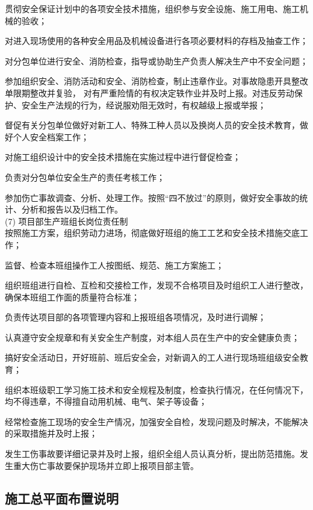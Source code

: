  贯彻安全保证计划中的各项安全技术措施，组织参与安全设施、施工用电、施工机械的验收；

 对进入现场使用的各种安全用品及机械设备进行各项必要材料的存档及抽查工作；

 对分包单位进行安全、消防检查，指导或协助生产负责人解决生产中不安全问题；

 参加组织安全、消防活动和安全、消防检查，制止违章作业。对事故隐患开具整改单限期整改并复验，
对有严重险情的有权决定轶作业并及时上报。对违反劳动保护、安全生产法规的行为，经说服劝阻无效时，有权越级上报或举报；

 督促有关分包单位做好对新工人、特殊工种人员以及换岗人员的安全技术教育，做好个人安全档案工作；

 对施工组织设计中的安全技术措施在实施过程中进行督促检查；

 负责对分包单位安全生产的责任考核工作；

 参加伤亡事故调查、分析、处理工作。按照“四不放过”的原则，做好安全事故的统计、分析和报告以及归档工作。\\

(7) 项目部生产班组长岗位责任制\\

 按照施工方案，组织劳动力进场，彻底做好班组的施工工艺和安全技术措施交底工作；

 监督、检查本班组操作工人按图纸、规范、施工方案施工；

 组织班组进行自检、互检和交接检工作，发现不合格项目及时组织工人进行整改，确保本班组工作面的质量符合标准；

 负责传达项目部的各项管理内容和上报班组各项情况，及时进行调解；

 认真遵守安全规章和有关安全生产制度，对本组人员在生产中的安全健康负责；

 搞好安全活动日，开好班前、班后安全会，对新调入的工人进行现场班组级安全教育；

 组织本班级职工学习施工技术和安全规程及制度，检查执行情况，在任何情况下，均不得违章，不得擅自动用机械、电气、架子等设备；

 经常检查施工现场的安全生产情况，加强安全自检，发现问题及时解决，不能解决的采取措施并及时上报；

 发生工伤事故要详细记录并及时上报，组织全组人员认真分析，提出防范措施。发生重大伤亡事故要保护现场并立即上报项目部主管。\\

\subsection{施工总平面布置说明}

